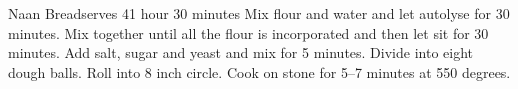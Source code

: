 \begin{recipe}{Naan Bread}{serves 4}{1 hour 30 minutes}
  Mix flour and water and let autolyse for 30 minutes.
  Mix together until all the flour is incorporated and then let sit for 30 minutes.
  Add salt, sugar and yeast and mix for 5 minutes.
  Divide into eight dough balls.
  Roll into 8 inch circle.
  Cook on stone for 5--7 minutes at 550 degrees.
\end{recipe}
